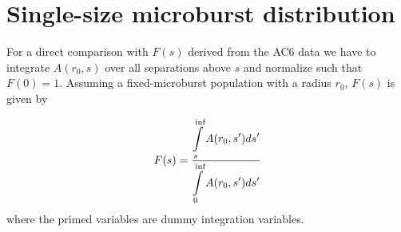\documentclass[12pt]{article}
\begin{document}
\section{Single-size microburst distribution}
For a direct comparison with $F(s)$ derived from the AC6 data we have to integrate $A(r_0, s)$ over all separations above $s$ and normalize such that $F(0) = 1$. Assuming a fixed-microburst population with a radius $r_0$, $F(s)$ is given by

\begin{equation}
F(s) = \frac{\displaystyle\int\displaylimits_{s}^{\inf} A(r_0, s') ds'}{\displaystyle\int\displaylimits_{0}^{\inf} A(r_0, s') ds'}
\end{equation} where the primed variables are dummy integration variables.
\end{document}
